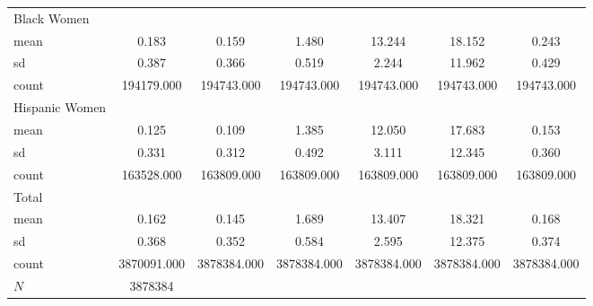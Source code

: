 {\begin{longtable}{l*{1}{cccccc}}
\hline
Black Women &            &            &            &            &            &            \\
mean        &       0.183&       0.159&       1.480&      13.244&      18.152&       0.243\\
sd          &       0.387&       0.366&       0.519&       2.244&      11.962&       0.429\\
count       &  194179.000&  194743.000&  194743.000&  194743.000&  194743.000&  194743.000\\
\hline
Hispanic Women&            &            &            &            &            &            \\
mean        &       0.125&       0.109&       1.385&      12.050&      17.683&       0.153\\
sd          &       0.331&       0.312&       0.492&       3.111&      12.345&       0.360\\
count       &  163528.000&  163809.000&  163809.000&  163809.000&  163809.000&  163809.000\\
\hline
Total       &            &            &            &            &            &            \\
mean        &       0.162&       0.145&       1.689&      13.407&      18.321&       0.168\\
sd          &       0.368&       0.352&       0.584&       2.595&      12.375&       0.374\\
count       & 3870091.000& 3878384.000& 3878384.000& 3878384.000& 3878384.000& 3878384.000\\
\hline
\(N\)       &     3878384&            &            &            &            &            \\
\hline\hline
\end{longtable}
}
